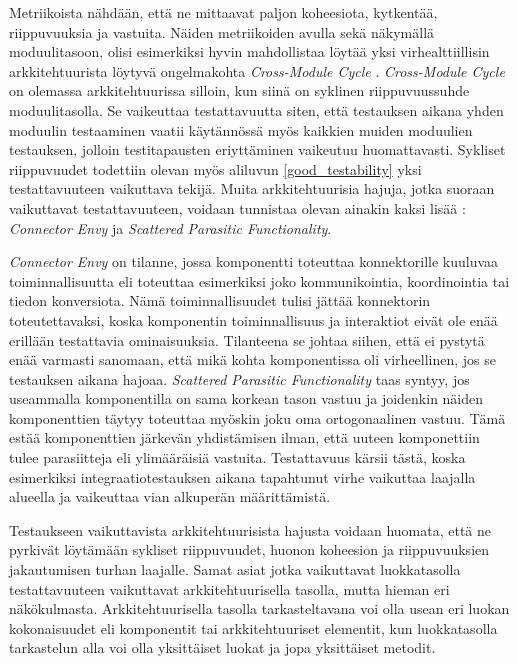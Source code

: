 \documentclass[finnish]{tktltiki2}
\numberwithin{table}{section}
\theoremstyle{definition}
\theoremstyle{remark}
\begin{document}

\noindent
Metriikoista nähdään, että ne mittaavat paljon koheesiota, kytkentää, riippuvuuksia ja vastuita. Näiden metriikoiden avulla sekä näkymällä moduulitasoon, olisi esimerkiksi hyvin mahdollistaa löytää yksi virhealttiillisin arkkitehtuurista löytyvä ongelmakohta \textit{Cross-Module Cycle} \citep[s. 57]{HotSpot}. \textit{Cross-Module Cycle} on olemassa arkkitehtuurissa silloin, kun siinä on syklinen riippuvuussuhde moduulitasolla. Se vaikeuttaa testattavuutta siten, että testauksen aikana yhden moduulin testaaminen vaatii käytännössä myös kaikkien muiden moduulien testauksen, jolloin testitapausten eriyttäminen vaikeutuu huomattavasti. Sykliset riippuvuudet todettiin olevan myös aliluvun \ref{good_testability} yksi testattavuuteen vaikuttava tekijä. Muita arkkitehtuurisia hajuja, jotka suoraan vaikuttavat testattavuuteen, voidaan tunnistaa olevan ainakin kaksi lisää \citep{garcia_identifying_2009}:  \textit{Connector Envy} ja \textit{Scattered Parasitic Functionality}.

\textit{Connector Envy} on tilanne, jossa komponentti toteuttaa konnektorille kuuluvaa toiminnallisuutta eli toteuttaa esimerkiksi joko kommunikointia, koordinointia tai tiedon konversiota. Nämä toiminnallisuudet tulisi jättää konnektorin toteutettavaksi, koska komponentin toiminnallisuus ja interaktiot eivät ole enää erillään testattavia ominaisuuksia. Tilanteena se johtaa siihen, että ei pystytä enää varmasti sanomaan, että mikä kohta komponentissa oli virheellinen, jos se testauksen aikana hajoaa. \textit{Scattered Parasitic Functionality} taas syntyy, jos useammalla komponentilla on sama korkean tason vastuu ja joidenkin näiden komponenttien täytyy toteuttaa myöskin joku oma ortogonaalinen vastuu. Tämä estää komponenttien järkevän yhdistämisen ilman, että uuteen komponettiin tulee parasiitteja eli ylimääräisiä vastuita. Testattavuus kärsii tästä, koska esimerkiksi integraatiotestauksen aikana tapahtunut virhe vaikuttaa laajalla alueella ja vaikeuttaa vian alkuperän määrittämistä. 

Testaukseen vaikuttavista arkkitehtuurisista hajusta voidaan huomata, että ne pyrkivät löytämään sykliset riippuvuudet, huonon koheesion ja riippuvuuksien jakautumisen turhan laajalle. Samat asiat jotka vaikuttavat luokkatasolla testattavuuteen vaikuttavat arkkitehtuurisella tasolla, mutta hieman eri näkökulmasta. Arkkitehtuurisella tasolla tarkasteltavana voi olla usean eri luokan kokonaisuudet eli komponentit tai arkkitehtuuriset elementit, kun luokkatasolla tarkastelun alla voi olla yksittäiset luokat ja jopa yksittäiset metodit.
\end{document}
